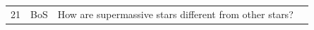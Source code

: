 \documentclass[10pt]{article}
\begin{document}
\begin{tiny}
\begin{longtable}{|r|p{0.375in}|p{1.275in}|p{3.5in}|}
21 &          BoS &                                                                                                                                                                                                                           How are supermassive stars different from other stars? &                                                                                                                                                                                                                                                                                                                                                                                                                                                                                                                                                                                                                                                                                                                                                                                                                                                                                                                                                                                                                                                                                                                                                                                                                                                                                                                                                                                                                                                                                                                                                                                                                                                                                                                                                                                                                                                                                                                                                                                                                                                                                                                                                                                                                                                                                                                                                                                                                                                                                                                                                                                                                                                                                                                                                                                                                                                                                                                                                                                                                                                                                               
\end{longtable}
\end{tiny}
\end{document}
